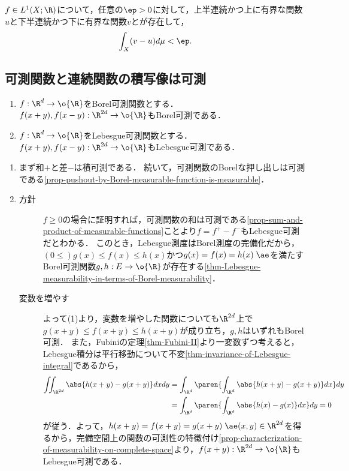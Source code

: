 \documentclass[uplatex, dvipdfmx]{jsreport}
\begin{document}
\begin{theorem}
    $f\in L^1(X;\R)$について，任意の$\ep>0$に対して，上半連続かつ上に有界な関数$u$と下半連続かつ下に有界な関数$v$とが存在して，
    \[\int_X(v-u)d\mu<\ep.\]
\end{theorem}

\subsection{可測関数と連続関数の積写像は可測}

\begin{proposition}[Lebesgue可測関数の平行移動]\label{prop-pararell-shift-of-Lebesgue-measurable-function}\mbox{}
    \begin{enumerate}
        \item $f:\R^d\to\o{\R}$をBorel可測関数とする．$f(x+y),f(x-y):\R^{2d}\to\o{\R}$もBorel可測である．
        \item $f:\R^d\to\o{\R}$をLebesgue可測関数とする．$f(x+y),f(x-y):\R^{2d}\to\o{\R}$もLebesgue可測である．
    \end{enumerate}
\end{proposition}
\begin{Proof}\mbox{}
    \begin{enumerate}
        \item まず和$+$と差$-$は積可測である．
        続いて，可測関数のBorelな押し出しは可測である\ref{prop-pushout-by-Borel-measurable-function-is-measurable}．
        \item 
        \begin{description}
            \item[方針] $f\ge 0$の場合に証明すれば，可測関数の和は可測である\ref{prop-sum-and-product-of-measurable-functions}ことより$f=f^+-f^-$もLebesgue可測だとわかる．
            このとき，Lebesgue測度はBorel測度の完備化だから，$(0\le)g(x)\le f(x)\le h(x)$かつ$g(x)=f(x)=h(x)\;\ae$を満たすBorel可測関数$g,h:E\to\o{\R}$が存在する\ref{thm-Lebesgue-measurability-in-terms-of-Borel-measurability}．
            \item[変数を増やす]
            よって(1)より，変数を増やした関数についても$\R^{2d}$上で$g(x+y)\le f(x+y)\le h(x+y)$が成り立ち，$g,h$はいずれもBorel可測．
            また，Fubiniの定理\ref{thm-Fubini-II}より一変数ずつ考えると，Lebesgue積分は平行移動について不変\ref{thm-invariance-of-Lebesgue-integral}であるから，
            \begin{align*}
                \iint_{\R^{2d}}\abs{h(x+y)-g(x+y)}dxdy&=\int_{\R^d}\paren{\int_{\R^d}\abs{h(x+y)-g(x+y)}dx}dy\\
                &=\int_{\R^d}\paren{\int_{\R^d}\abs{h(x)-g(x)}dx}dy=0
            \end{align*}
            が従う．よって，$h(x+y)=f(x+y)=g(x+y)\;\ae (x,y)\in\R^{2d}$を得るから，完備空間上の関数の可測性の特徴付け\ref{prop-characterization-of-measurability-on-complete-space}より，$f(x+y):\R^{2d}\to\o{\R}$もLebesgue可測である．
        \end{description}
    \end{enumerate}
\end{Proof}
\end{document}
